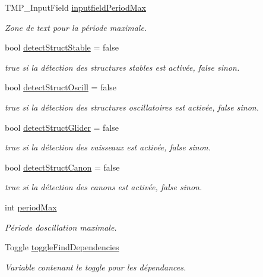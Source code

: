 \begin{DoxyCompactItemize}
T\+M\+P\+\_\+\+Input\+Field \mbox{\hyperlink{class_parameters_a9e5e6a9e22f6324e6373feba6b311808}{inputfield\+Period\+Max}}
\begin{DoxyCompactList}\small\item\em Zone de text pour la période maximale. \end{DoxyCompactList}\item 
bool \mbox{\hyperlink{class_parameters_a9cee3a4a38b1085ad46833289acf1336}{detect\+Struct\+Stable}} = false
\begin{DoxyCompactList}\small\item\em true si la détection des structures stables est activée, false sinon. \end{DoxyCompactList}\item 
bool \mbox{\hyperlink{class_parameters_a861434feae8c97b839615973c0e0e2ec}{detect\+Struct\+Oscill}} = false
\begin{DoxyCompactList}\small\item\em true si la détection des structures oscillatoires est activée, false sinon. \end{DoxyCompactList}\item 
bool \mbox{\hyperlink{class_parameters_a4785fe04733d4ef9e76e314ca2fc120c}{detect\+Struct\+Glider}} = false
\begin{DoxyCompactList}\small\item\em true si la détection des vaisseaux est activée, false sinon. \end{DoxyCompactList}\item 
bool \mbox{\hyperlink{class_parameters_a87a3d90929121cd0f27d1aeb55551dcc}{detect\+Struct\+Canon}} = false
\begin{DoxyCompactList}\small\item\em true si la détection des canons est activée, false sinon. \end{DoxyCompactList}\item 
int \mbox{\hyperlink{class_parameters_a5f6937553d6c12a654fb93e1b6838d53}{period\+Max}}
\begin{DoxyCompactList}\small\item\em Période d\textquotesingle{}oscillation maximale. \end{DoxyCompactList}\item 
Toggle \mbox{\hyperlink{class_parameters_a90f764b548eabcd6bb826cfb8ccd750f}{toggle\+Find\+Dependencies}}
\begin{DoxyCompactList}\small\item\em Variable contenant le toggle pour les dépendances. \end{DoxyCompactList}\item 

\end{DoxyCompactItemize}
